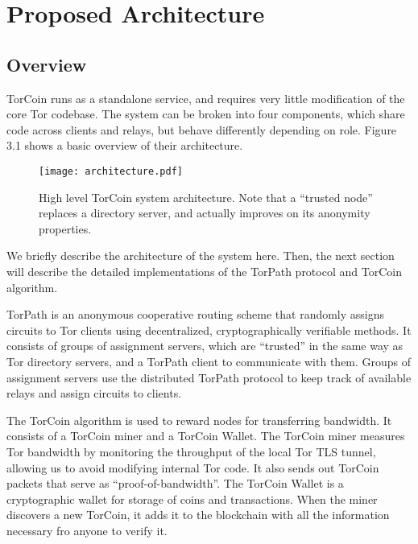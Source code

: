 \section{Proposed Architecture} \label{arch}

\subsection{Overview}

TorCoin runs as a standalone service, and requires very little modification of
the core Tor codebase. The system can be broken into four components, which
share code across clients and relays, but behave differently depending on
role. Figure 3.1 shows a basic overview of their architecture.

\begin{figure}
  \centering
    \texttt{[image: architecture.pdf]}
  \caption{High level TorCoin system architecture. Note that a ``trusted node''
  replaces a directory server, and actually improves on its anonymity properties.}
\end{figure}

We briefly describe the architecture of the system here. Then, the
next section will describe the detailed implementations of the TorPath
protocol and TorCoin algorithm.

TorPath is an anonymous cooperative routing scheme that randomly assigns
circuits to Tor clients using decentralized, cryptographically verifiable
methods. It consists of groups of assignment servers, which are ``trusted'' in
the same way as Tor directory servers, and a TorPath client to communicate
with them.  Groups of assignment servers use the distributed TorPath protocol
to  keep track of available relays and assign circuits to clients.

The TorCoin algorithm is used to reward nodes for transferring bandwidth. It
consists  of a TorCoin miner and a TorCoin Wallet. The TorCoin miner measures
Tor bandwidth by monitoring the  throughput of the local Tor TLS tunnel,
allowing us to avoid modifying internal  Tor code. It also sends out TorCoin
packets that serve as ``proof-of-bandwidth''. The TorCoin Wallet is a
cryptographic wallet for storage of coins and transactions. When the miner
discovers a new TorCoin, it adds it to the blockchain with all the information
necessary fro anyone to verify it.


